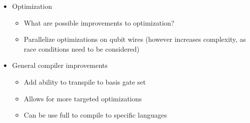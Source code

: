 \begin{itemize}
\begin{itemize}
\begin{itemize}
        \end{itemize}
        \item Optimization
        \begin{itemize}
            \item What are possible improvements to optimization?
            \item Parallelize optimizations on qubit wires (however increases complexity, as race conditions need to be considered)
        \end{itemize}
        \item General compiler improvements
        \begin{itemize}
            \item Add ability to transpile to basis gate set
            \item Allows for more targeted optimizations
            \item Can be use full to compile to specific languages
        \end{itemize}
    \end{itemize}

\end{itemize}